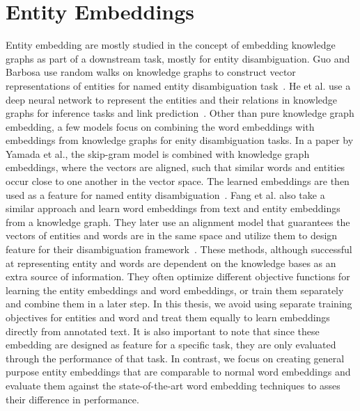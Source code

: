 \section{Entity Embeddings}
\label{sec:enity_embed}
Entity embedding are mostly studied in the concept of embedding knowledge graphs as part of a downstream task, mostly for entity disambiguation. Guo and Barbosa use random walks on knowledge graphs to construct vector representations of entities for named entity disambiguation task~. He et al. use a deep neural network to represent the entities and their relations in knowledge graphs for inference tasks and link prediction~. Other than pure knowledge graph embedding, a few models focus on combining the word embeddings with embeddings from knowledge graphs for enity disambiguation tasks. In a paper by Yamada et al., the skip-gram model is combined with knowledge graph embeddings, where the vectors are aligned, such that similar words and entities occur close to one another in the vector space. The learned embeddings are then used as a feature for named entity disambiguation~. Fang et al. also take a similar approach and learn word embeddings from text and entity embeddings from a knowledge graph. They later use an alignment model that guarantees the vectors of entities and words are in the same space and utilize them to design feature for their disambiguation framework~. These methods, although successful at representing entity and words are dependent on the knowledge bases as an extra source of information. They often optimize different objective functions for learning the entity embeddings and word embeddings, or train them separately and combine them in a later step. In this thesis, we avoid using separate training objectives for entities and word and treat them equally to learn embeddings directly from annotated text. It is also important to note that since these embedding are designed as feature for a specific task, they are only evaluated through the performance of that task. In contrast, we focus on creating general purpose entity embeddings that are comparable to normal word embeddings and evaluate them against the state-of-the-art word embedding techniques to asses their difference in performance. \\

